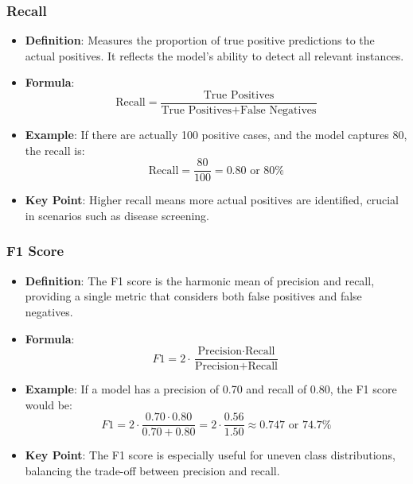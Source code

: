 \documentclass[aspectratio=169]{beamer}
\begin{document}
\begin{frame}[fragile]
    \frametitle{Recall}
    \begin{itemize}
        \item \textbf{Definition}: Measures the proportion of true positive predictions to the actual positives. 
        It reflects the model's ability to detect all relevant instances.
        \item \textbf{Formula}:
        \begin{equation}
        \text{Recall} = \frac{\text{True Positives}}{\text{True Positives} + \text{False Negatives}} 
        \end{equation}
        \item \textbf{Example}: If there are actually 100 positive cases, and the model captures 80, the recall is:
        \begin{equation}
        \text{Recall} = \frac{80}{100} = 0.80 \text{ or } 80\%
        \end{equation}
        \item \textbf{Key Point}: Higher recall means more actual positives are identified, crucial in scenarios such as disease screening.
    \end{itemize}
\end{frame}

\begin{frame}[fragile]
    \frametitle{F1 Score}
    \begin{itemize}
        \item \textbf{Definition}: The F1 score is the harmonic mean of precision and recall, providing a single metric that considers both false positives and false negatives.
        \item \textbf{Formula}:
        \begin{equation}
        F1 = 2 \cdot \frac{\text{Precision} \cdot \text{Recall}}{\text{Precision} + \text{Recall}} 
        \end{equation}
        \item \textbf{Example}: If a model has a precision of 0.70 and recall of 0.80, the F1 score would be:
        \begin{equation}
        F1 = 2 \cdot \frac{0.70 \cdot 0.80}{0.70 + 0.80} = 2 \cdot \frac{0.56}{1.50} \approx 0.747 \text{ or } 74.7\%
        \end{equation}
        \item \textbf{Key Point}: The F1 score is especially useful for uneven class distributions, balancing the trade-off between precision and recall.
    \end{itemize}
\end{frame}
\end{document}

